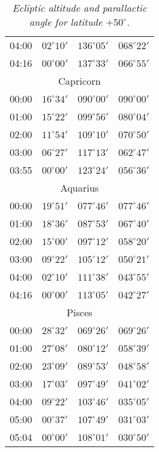 \begin{table}
\begin{Parallel}{}{}
{{\begin{tabular}{l|lll}
04:00 & $02^\circ 10'$ & $136^\circ 05'$& $068^\circ 22'$ \\
04:16 & $00^\circ 00'$ & $137^\circ 33'$& $066^\circ 55'$ \\
\multicolumn{4}{c}{Capricorn}\\
00:00 & $16^\circ 34'$ & $090^\circ 00'$& $090^\circ 00'$ \\
01:00 & $15^\circ 22'$ & $099^\circ 56'$& $080^\circ 04'$ \\
02:00 & $11^\circ 54'$ & $109^\circ 10'$& $070^\circ 50'$ \\
03:00 & $06^\circ 27'$ & $117^\circ 13'$& $062^\circ 47'$ \\
03:55 & $00^\circ 00'$ & $123^\circ 24'$& $056^\circ 36'$ \\
\multicolumn{4}{c}{Aquarius}\\
00:00 & $19^\circ 51'$ & $077^\circ 46'$& $077^\circ 46'$ \\
01:00 & $18^\circ 36'$ & $087^\circ 53'$& $067^\circ 40'$ \\
02:00 & $15^\circ 00'$ & $097^\circ 12'$& $058^\circ 20'$ \\
03:00 & $09^\circ 22'$ & $105^\circ 12'$& $050^\circ 21'$ \\
04:00 & $02^\circ 10'$ & $111^\circ 38'$& $043^\circ 55'$ \\
04:16 & $00^\circ 00'$ & $113^\circ 05'$& $042^\circ 27'$ \\
\multicolumn{4}{c}{Pisces}\\
00:00 & $28^\circ 32'$ & $069^\circ 26'$& $069^\circ 26'$ \\
01:00 & $27^\circ 08'$ & $080^\circ 12'$& $058^\circ 39'$ \\
02:00 & $23^\circ 09'$ & $089^\circ 53'$& $048^\circ 58'$ \\
03:00 & $17^\circ 03'$ & $097^\circ 49'$& $041^\circ 02'$ \\
04:00 & $09^\circ 22'$ & $103^\circ 46'$& $035^\circ 05'$ \\
05:00 & $00^\circ 37'$ & $107^\circ 49'$& $031^\circ 03'$ \\
05:04 & $00^\circ 00'$ & $108^\circ 01'$& $030^\circ 50'$ \\
\end{tabular}
}}
\end{Parallel}
\caption{\em Ecliptic altitude and parallactic angle for latitude $+50^\circ$.}
\end{table}

